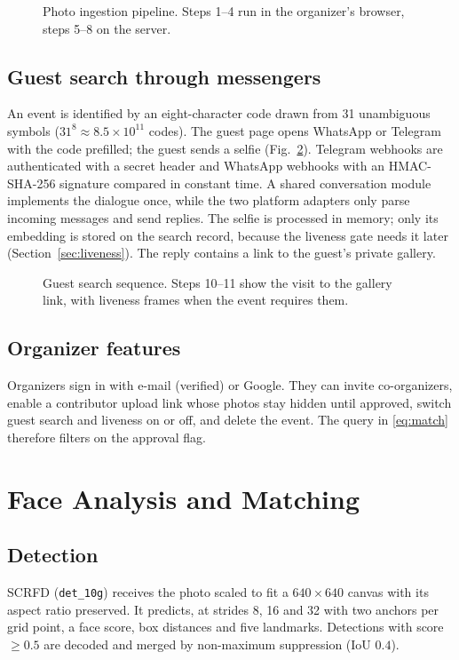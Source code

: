 \documentclass[conference]{IEEEtran}
\begin{document}
\begin{figure}[!t]
\centering
\resizebox{0.82\textwidth}{!}{}
\caption{Photo ingestion pipeline. Steps 1--4 run in the organizer's browser, steps 5--8 on the server.}
\label{fig:index}
\end{figure}

\subsection{Guest search through messengers}
An event is identified by an eight-character code drawn from 31 unambiguous symbols ($31^8\approx 8.5\times10^{11}$ codes). The guest page opens WhatsApp or Telegram with the code prefilled; the guest sends a selfie (Fig.~\ref{fig:search}). Telegram webhooks are authenticated with a secret header and WhatsApp webhooks with an HMAC-SHA-256 signature compared in constant time. A shared conversation module implements the dialogue once, while the two platform adapters only parse incoming messages and send replies. The selfie is processed in memory; only its embedding is stored on the search record, because the liveness gate needs it later (Section~\ref{sec:liveness}). The reply contains a link to the guest's private gallery.

\begin{figure}[!t]
\centering
\resizebox{0.78\textwidth}{!}{}
\caption{Guest search sequence. Steps 10--11 show the visit to the gallery link, with liveness frames when the event requires them.}
\label{fig:search}
\end{figure}

\subsection{Organizer features}
Organizers sign in with e-mail (verified) or Google. They can invite co-organizers, enable a contributor upload link whose photos stay hidden until approved, switch guest search and liveness on or off, and delete the event. The query in \eqref{eq:match} therefore filters on the approval flag.

\section{Face Analysis and Matching}\label{sec:face}
\subsection{Detection}
SCRFD (\texttt{det\_10g}) \cite{guo2022scrfd} receives the photo scaled to fit a $640\times640$ canvas with its aspect ratio preserved. It predicts, at strides 8, 16 and 32 with two anchors per grid point, a face score, box distances and five landmarks. Detections with score $\ge0.5$ are decoded and merged by non-maximum suppression (IoU $0.4$).
\end{document}
